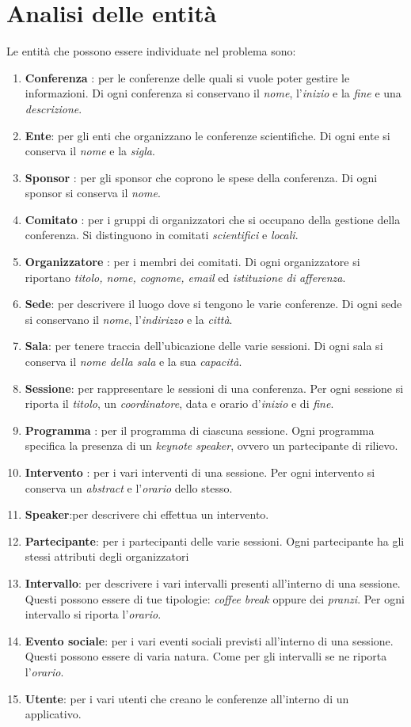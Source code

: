 \section{Analisi delle entità}
Le entità che possono essere individuate nel problema sono:
\begin{enumerate}
\item \textbf{Conferenza} : per le conferenze delle quali si vuole poter gestire le informazioni. Di ogni conferenza si conservano il \textit{nome}, l'\textit{inizio} e la \textit{fine} e una \textit{descrizione}.
\item \textbf{Ente}: per gli enti che organizzano le conferenze scientifiche. Di ogni ente si conserva il \textit{nome} e la \textit{sigla}. 
\item \textbf{Sponsor} : per gli sponsor che coprono le spese della conferenza. Di ogni sponsor si conserva il \textit{nome}.
\item \textbf{Comitato} : per i gruppi di organizzatori che si occupano della gestione della conferenza. Si distinguono in comitati \textit{scientifici} e \textit{locali}. 
\item \textbf{Organizzatore} : per i membri dei comitati. Di ogni organizzatore si riportano \textit{titolo, nome, cognome, email} ed \textit{istituzione di afferenza}.
\item \textbf{Sede}: per descrivere il luogo dove si tengono le varie conferenze. Di ogni sede si conservano il \textit{nome}, l'\textit{indirizzo} e la \textit{città}.
\item \textbf{Sala}: per tenere traccia dell'ubicazione delle varie sessioni. Di ogni sala si conserva il \textit{nome della sala} e la sua \textit{capacità}.
\item \textbf{Sessione}: per rappresentare le sessioni di una conferenza. Per ogni sessione si riporta il \textit{titolo}, un \textit{coordinatore}, data e orario d'\textit{inizio} e di \textit{fine}.
\item \textbf{Programma} : per il programma di ciascuna sessione. Ogni programma specifica la presenza di un \textit{keynote speaker}, ovvero un partecipante di rilievo.
\item \textbf{Intervento} : per i vari interventi di una sessione. Per ogni intervento si conserva un \textit{abstract} e l'\textit{orario} dello stesso.
\item \textbf{Speaker}:per descrivere chi effettua un intervento. 
\item \textbf{Partecipante}: per i partecipanti delle varie sessioni. Ogni partecipante ha gli stessi attributi degli organizzatori
\item \textbf{Intervallo}: per descrivere i vari intervalli presenti all'interno di una sessione. Questi possono essere di tue tipologie: \textit{coffee break} oppure dei \textit{pranzi}. Per ogni intervallo si riporta l'\textit{orario}. 
\item \textbf{Evento sociale}: per i vari eventi sociali previsti all'interno di una sessione. Questi possono essere di varia natura. Come per gli intervalli se ne riporta l'\textit{orario}.
\item \textbf{Utente}: per i vari utenti che creano le conferenze all'interno di un applicativo. 
\end{enumerate}